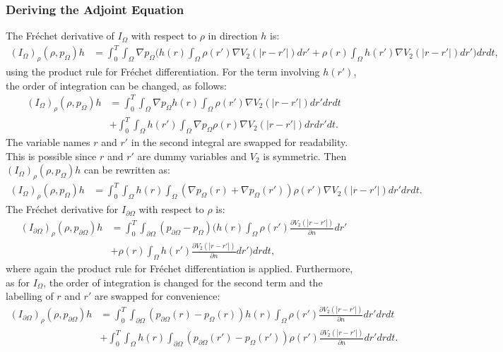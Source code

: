 \subsubsection{Deriving the Adjoint Equation}
The Fr\'echet derivative of $I_\Omega$ with respect to $\rho$ in direction $h$ is:
\begin{align*}
({I_\Omega})_\rho(\rho,p_\Omega)h &= \int_0^T \int_\Omega \nabla  p_\Omega \bigg( h(r) \int_\Omega \rho(r') \nabla V_2(|r-r'|) dr' + \rho(r) \int_\Omega h(r') \nabla V_2(|r-r'|) dr' \bigg)  dr dt,
\end{align*}
using the product rule for Fr\'echet differentiation.
For the term involving $h(r')$, the order of integration can be changed, as follows:
\begin{align*}
({I_\Omega})_\rho(\rho,p_\Omega)h &= \int_0^T \int_\Omega \nabla  p_\Omega  h(r) \int_\Omega \rho(r') \nabla V_2(|r-r'|) dr' dr dt \\
&+\int_0^T \int_\Omega h(r')  \int_\Omega \nabla  p_\Omega \rho(r) \nabla V_2(|r-r'|) dr dr' dt.
\end{align*} 
The variable names $r$ and $r'$ in the second integral are swapped for readability. This is possible since $r$ and $r'$ are dummy variables and $V_2$ is symmetric. Then $({I_\Omega})_\rho(\rho,p_\Omega)h$ can be rewritten as:
\begin{align*}
({I_\Omega})_\rho(\rho,p_\Omega)h &= \int_0^T \int_\Omega  h(r) \int_\Omega (\nabla  p_\Omega(r)+\nabla  p_\Omega(r')) \rho(r') \nabla V_2(|r-r'|) dr' dr dt .
\end{align*} 
The Fr\'echet derivative for $I_{\partial \Omega}$ with respect to $\rho$ is:
\begin{align*}
({I_{\partial \Omega}})_\rho(\rho,p_{\partial \Omega})h&=\int_0^T \int_{\partial \Omega} ( p_{\partial \Omega} - p_\Omega) \bigg( h(r)  \int_\Omega \rho(r') \frac{\partial V_2(|r-r'|)}{\partial n} dr'\\
&+ \rho(r)  \int_\Omega h(r') \frac{\partial V_2(|r-r'|)}{\partial n} dr' \bigg)dr dt,
\end{align*}
where again the product rule for Fr\'echet differentiation is applied. Furthermore, as for $I_\Omega$, the order of integration is changed for the second term and the labelling of $r$ and $r'$ are swapped for convenience:
\begin{align*}
({I_{\partial \Omega}})_\rho(\rho,p_{\partial \Omega})h&=\int_0^T \int_{\partial \Omega} ( p_{\partial \Omega}(r) - p_\Omega(r)) h(r)  \int_\Omega \rho(r') \frac{\partial V_2(|r-r'|)}{\partial n} dr' dr dt \\
&+ \int_0^T \int_\Omega h(r)\int_{\partial \Omega} ( p_{\partial \Omega}(r') - p_\Omega(r')) \rho(r')   \frac{\partial V_2(|r-r'|)}{\partial n} dr' dr dt.
\end{align*}
